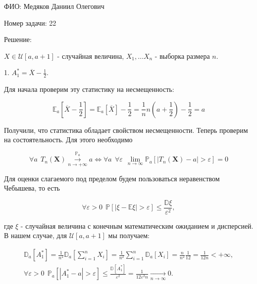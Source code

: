 \documentclass[14pt]{extarticle}
\begin{document}
ФИО: Медяков Даниил Олегович

\vspace{10pt}

Номер задачи: 22

\vspace{10pt}

Решение:

\vspace{10pt}

$X\in \mathcal{U}[a, a+1]$ - случайная величина, $X_1, \ldots X_n$ - выборка размера $n$.

1. $A_1^* = \overline{X} - \frac{1}{2}$. 

Для начала проверим эту статистику на несмещенность:

\begin{equation*}
    \mathbb E_a \left[\overline{X} - \frac{1}{2}\right] = \mathbb E_a \left[\overline{X}\right] - \frac{1}{2} = \frac{1}{n}n\left(a + \frac{1}{2}\right) - \frac{1}{2} = a
\end{equation*}

Получили, что статистика обладает свойством несмещенности. Теперь проверим на состоятельность. Для этого необходимо

\begin{equation*}
    \forall a~~ T_n(\textbf{X})\overset{\mathbb P_a}{\underset{n\rightarrow+\infty}{\longrightarrow}}a \Leftrightarrow \forall a~~\forall\varepsilon~~ \underset{n\rightarrow\infty}{\lim} \mathbb P_a\left[|T_n(\textbf{X}) - a| > \varepsilon\right] = 0
\end{equation*}

Для оценки слагаемого под пределом будем пользоваться неравенством Чебышева, то есть

\begin{equation*}
    \forall \varepsilon > 0 ~~\mathbb P\left[|\xi - \mathbb E\xi| > \varepsilon\right] \leqslant \frac{\mathbb D\xi}{\varepsilon^2},
\end{equation*}

где $\xi$ - случайная величина с конечным математическим ожиданием и дисперсией. В нашем случае, для $\mathcal{U}[a, a+1]$ мы получаем:

\begin{gather*}
    \mathbb D_a[A_1^*] = \frac{1}{n^2}\mathbb D_a\left[\sum\limits_{i=1}^n X_i\right] = \frac{1}{n^2}\sum\limits_{i=1}^n \mathbb D_a[X_i] = \frac{n}{n^2}\frac{1}{12} = \frac{1}{12n} < +\infty,\\
    \forall \varepsilon > 0 ~~ \mathbb P_a[|A_1^* - a| > \varepsilon] \leqslant \frac{\mathbb D[A_1^*]}{\varepsilon^2} = \frac{1}{12\varepsilon^2n}\underset{n\rightarrow\infty}{\longrightarrow}0.
\end{gather*}
\end{document}
